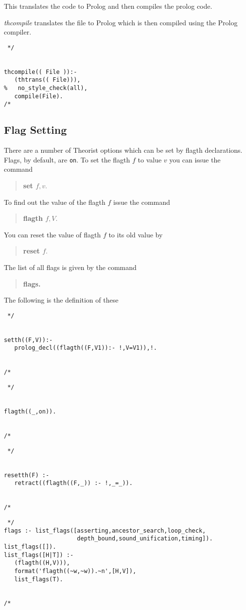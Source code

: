 This translates the code to Prolog and then compiles the prolog code.

{\em thcompile} translates the file to Prolog
which is then compiled using the Prolog compiler.
\begin{verbatim} */


thcompile(( File )):-
   (thtrans(( File))),
%   no_style_check(all),
   compile(File).
/* \end{verbatim}


\subsection{Flag Setting} \label{flags}
There are a number of Theorist options which can be set by flagth declarations.
Flags, by default, are {\tt on}.
To set the flagth $f$ to value $v$ you can issue the command
\begin{verse}
\bf set $f,v.$
\end{verse}
To find out the value of the flagth $f$ issue the command
\begin{verse}
\bf flagth $f,V.$
\end{verse}
You can reset the value of flagth $f$ to its old value by
\begin{verse}
\bf reset $f.$
\end{verse}
The list of all flags is given by the command
\begin{verse}
\bf flags.
\end{verse}

The following is the definition of these
\begin{verbatim} */


setth((F,V)):-
   prolog_decl((flagth((F,V1)):- !,V=V1)),!.


/* \end{verbatim}
\begin{verbatim} */


flagth((_,on)).


/* \end{verbatim}
\begin{verbatim} */


resetth(F) :-
   retract((flagth((F,_)) :- !,_=_)).


/* \end{verbatim}
\begin{verbatim} */
flags :- list_flags([asserting,ancestor_search,loop_check,
                     depth_bound,sound_unification,timing]).
list_flags([]).
list_flags([H|T]) :-
   (flagth((H,V))),
   format('flagth((~w,~w)).~n',[H,V]),
   list_flags(T).
                          

/* \end{verbatim}
